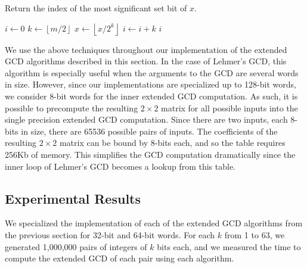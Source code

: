 \documentclass{ucalgthes1}
\theoremstyle{definition}
\newcommand{\floor}[1]{\left\lfloor #1 \right\rfloor}
\begin{document}
\begin{algorithm}[h]
\caption{Return the index of the most significant set bit of $x$.}
\label{alg:msb}
\begin{algorithmic}[1]
\STATE $i \gets 0$
\STATE $k \gets \floor{m/2}$ 
		\STATE $x \gets \floor{x / 2^k}$
		\STATE $i \gets i + k$
	\ENDIF
\ENDWHILE
\RETURN $i$
\end{algorithmic}
\end{algorithm}

We use the above techniques throughout our implementation of the extended GCD algorithms described in this section.  In the case of Lehmer's GCD, this algorithm is especially useful when the arguments to the GCD are several words in size.  However, since our implementations are specialized up to 128-bit words, we consider 8-bit words for the inner extended GCD computation.  As such, it is possible to precompute the resulting $2 \times 2$ matrix for all possible inputs into the single precision extended GCD computation.  Since there are two inputs, each 8-bits in size, there are 65536 possible pairs of inputs.  The coefficients of the resulting $2 \times 2$ matrix can be bound by 8-bits each, and so the table requires 256Kb of memory. This simplifies the GCD computation dramatically since the inner loop of Lehmer's GCD becomes a lookup from this table.

\subsection{Experimental Results}
\label{subsec:gcdResults}

We specialized the implementation of each of the extended GCD algorithms from the previous section for 32-bit and 64-bit words.  For each $k$ from 1 to 63, we generated 1,000,000 pairs of integers of $k$ bits each, and we measured the time to compute the extended GCD of each pair using each algorithm.
\end{document}

